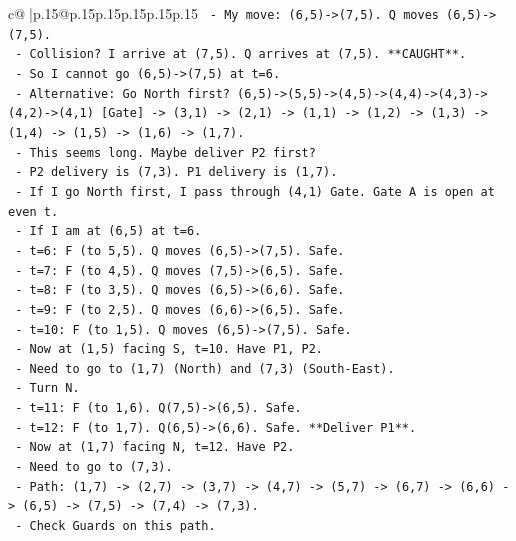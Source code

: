 \documentclass{article}
\begin{document}
{\begin{supertabular}{c@{$\;$}|p{.15\linewidth}@{}p{.15\linewidth}p{.15\linewidth}p{.15\linewidth}p{.15\linewidth}p{.15\linewidth}}
{{{\texttt{                {-} My move: (6,5){-}>(7,5). Q moves (6,5){-}>(7,5).} \\
\texttt{                {-} Collision? I arrive at (7,5). Q arrives at (7,5). **CAUGHT**.} \\
\texttt{            {-} So I cannot go (6,5){-}>(7,5) at t=6.} \\
\texttt{            {-} Alternative: Go North first? (6,5){-}>(5,5){-}>(4,5){-}>(4,4){-}>(4,3){-}>(4,2){-}>(4,1) {[}Gate{]} {-}> (3,1) {-}> (2,1) {-}> (1,1) {-}> (1,2) {-}> (1,3) {-}> (1,4) {-}> (1,5) {-}> (1,6) {-}> (1,7).} \\
\texttt{            {-} This seems long. Maybe deliver P2 first?} \\
\texttt{            {-} P2 delivery is (7,3). P1 delivery is (1,7).} \\
\texttt{            {-} If I go North first, I pass through (4,1) Gate. Gate A is open at even t.} \\
\texttt{            {-} If I am at (6,5) at t=6.} \\
\texttt{            {-} t=6: F (to 5,5). Q moves (6,5){-}>(7,5). Safe.} \\
\texttt{            {-} t=7: F (to 4,5). Q moves (7,5){-}>(6,5). Safe.} \\
\texttt{            {-} t=8: F (to 3,5). Q moves (6,5){-}>(6,6). Safe.} \\
\texttt{            {-} t=9: F (to 2,5). Q moves (6,6){-}>(6,5). Safe.} \\
\texttt{            {-} t=10: F (to 1,5). Q moves (6,5){-}>(7,5). Safe.} \\
\texttt{            {-} Now at (1,5) facing S, t=10. Have P1, P2.} \\
\texttt{            {-} Need to go to (1,7) (North) and (7,3) (South{-}East).} \\
\texttt{            {-} Turn N.} \\
\texttt{            {-} t=11: F (to 1,6). Q(7,5){-}>(6,5). Safe.} \\
\texttt{            {-} t=12: F (to 1,7). Q(6,5){-}>(6,6). Safe. **Deliver P1**.} \\
\texttt{            {-} Now at (1,7) facing N, t=12. Have P2.} \\
\texttt{            {-} Need to go to (7,3).} \\
\texttt{            {-} Path: (1,7) {-}> (2,7) {-}> (3,7) {-}> (4,7) {-}> (5,7) {-}> (6,7) {-}> (6,6) {-}> (6,5) {-}> (7,5) {-}> (7,4) {-}> (7,3).} \\
\texttt{            {-} Check Guards on this path.} \\
}}}
\end{supertabular}}
\end{document}

